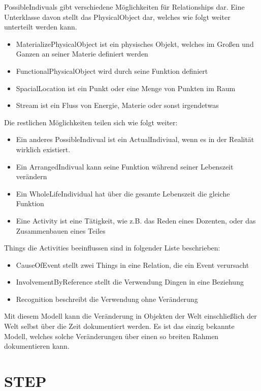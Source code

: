 PossibleIndivuals gibt verschiedene Möglichkeiten für Relationships dar. Eine Unterklasse davon stellt das PhysicalObject dar, welches wie folgt weiter unterteilt werden kann.

\begin{itemize}
\item MaterializePhysicalObject ist ein physisches Objekt, welches im Großen und Ganzen an seiner Materie definiert werden
\item FunctionalPhysicalObject wird durch seine Funktion definiert
\item SpacialLocation ist ein Punkt oder eine Menge von Punkten im Raum
\item Stream ist ein Fluss von Energie, Materie oder sonst irgendetwas
\end{itemize}

Die restlichen Möglichkeiten teilen sich wie folgt weiter:

\begin{itemize}
\item Ein anderes PossibleIndivual ist ein ActualIndiviual, wenn es in der Realität wirklich existiert.
\item Ein ArrangedIndivual kann seine Funktion während seiner Lebenszeit verändern
\item Ein WholeLifeIndividual hat über die gesamte Lebenszeit die gleiche Funktion
\item Eine Activity ist eine Tätigkeit, wie z.B. das Reden eines Dozenten, oder das Zusammenbauen eines Teiles
\end{itemize}

Things die Activities beeinflussen sind in folgender Liste beschrieben:

\begin{itemize}
\item CauseOfEvent stellt zwei Things in eine Relation, die ein Event verursacht
\item InvolvementByReference stellt die Verwendung Dingen in eine Beziehung
\item Recognition beschreibt die Verwendung ohne Veränderung
\end{itemize}

Mit diesem Modell kann die Veränderung in Objekten der Welt einschließlich der Welt selbst über die Zeit dokumentiert werden. Es ist das einzig bekannte Modell, welches solche Veränderungen über einen so breiten Rahmen dokumentieren kann.

\chapter{STEP}


